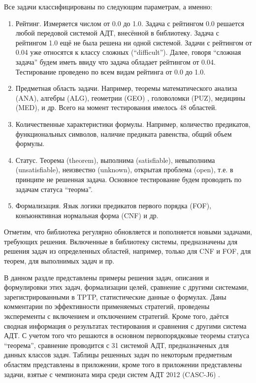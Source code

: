 Все задачи классифицированы по следующим параметрам, а именно:
\begin{enumerate}
\item {Рейтинг.} Измеряется числом от 0.0 до 1.0. Задача с рейтингом 0.0 решается любой передовой системой АДТ, внесённой в библиотеку. Задача с рейтингом 1.0 ещё не была решена ни одной системой. Задачи с рейтингом от 0.04 уже относятся к классу сложных (``difficult''). Далее, говоря ``сложная задача'' будем иметь ввиду что задача обладает рейтингом от 0.04. Тестирование проведено по всем видам рейтинга от 0.0 до 1.0.
\item {Предметная область задачи.} Например, теоремы математического анализа (ANA), алгебры (ALG), геометрии (GEO) \cite{constrgeo}, головоломки (PUZ), медицины (MED), и др. Всего на момент тестирования имелось 48 областей.
\item {Количественные характеристики формулы.} Например, количество предикатов, функциональных символов, наличие предиката равенства, общий объем формулы.
\item {Статус.} Теорема (theorem), выполнима (satisfiable), невыполнима (unsatis\-fiable), неизвестно (unknown), открытая проблема (open), т.е. в принципе не решенная задача. Основное тестирование будем проводить по задачам статуса ``теорма''.
\item {Формализация.} Язык логики предикатов первого порядка (FOF), конъюнктивная нормальная форма (CNF) и др.
\end{enumerate}

Отметим, что библиотека регулярно обновляется и пополняется новыми задачами, требующих решения. Включенные в библиотеку системы, предназначены для решения задач из определенных областей, например, только для CNF и FOF, для теорем, для выполнимых задач и пр.

В данном раздле представлены примеры решения задач, описания и формулировки этих задач, формализации целей, сравнение с другими системами, зарегистрированными в TPTP, статистические данные о формулах. Даны комментарии по эффективности применяемых стратегий, проведены эксперементы с включением и отключением стратегий. Кроме того, даётся сводная информация о результатах тестирования и сравнения с другими система АДТ. С учетом того что решаются в основном первопорядковые теоремы статуса ``теорема'', сравнение проводится с 31 системой АДТ, предназначеных для данных классов задач. Таблицы решенных задач по некоторым предметным областям представлены в приложении, кроме того в приложении представлены задачи, взятые с чемпионата мира среди систем АДТ 2012 (CASC-J6) \cite{CASC}.




